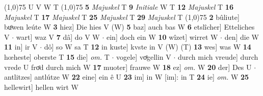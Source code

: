 \documentclass[8pt,a4paper,notitlepage]{article}
\begin{document}
\begin{table}[ht]
\begin{minipage}[t]{0.5\linewidth}
\line(1,0){75} \newline
U V W T \newline
\line(1,0){75} \newline
\textbf{5} \textit{Majuskel} T  \textbf{9} \textit{Initiale} W T  \textbf{12} \textit{Majuskel} T  \textbf{16} \textit{Majuskel} T  \textbf{17} \textit{Majuskel} T  \textbf{25} \textit{Majuskel} T  \textbf{29} \textit{Majuskel} T  \newline
\line(1,0){75} \newline
\textbf{2} bûliute] buͦwen leúte W \textbf{3} hiez] Die hies V (W) \textbf{5} baz] auch bas W \textbf{6} etslîcher] Etteliches V  $\cdot$ wart] waz V \textbf{7} dâ] do V W  $\cdot$ ein] doch ein W \textbf{10} wîzet] wirret W  $\cdot$ den] die W \textbf{11} in] ir V  $\cdot$ dô] so W sa T \textbf{12} in kuste] kvste in V (W) (T) \textbf{13} wes] was W \textbf{14} hœheste] oberste T \textbf{15} die] \textit{om.} T  $\cdot$ vogele] voͤgellin V  $\cdot$ durch mich vreude] durch vrede U froͤd durch mich W \textbf{17} muoter] frauwe W \textbf{18} ez] \textit{om.} W \textbf{20} der] Des U  $\cdot$ antlitzes] antlútze W \textbf{22} eine] ein ê U \textbf{23} im] in W [im]: in T \textbf{24} ie] \textit{om.} W \textbf{25} hellewirt] hellen wirt W \newline
\end{minipage}
\end{table}
\end{document}
